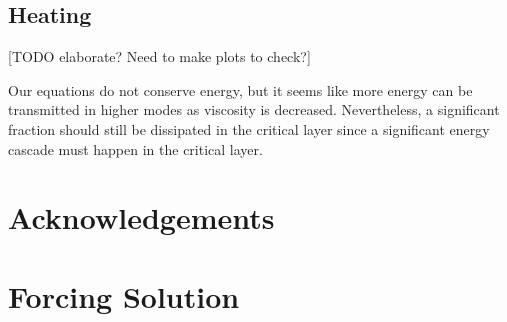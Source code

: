 \documentclass[
        fleqn,
        usenatbib,
    ]{mnras}
\begin{document}
\subsection{Heating}

[TODO elaborate? Need to make plots to check?]

Our equations do not conserve energy, but it seems like more energy can be
transmitted in higher modes as viscosity is decreased. Nevertheless, a
significant fraction should still be dissipated in the critical layer since a
significant energy cascade must happen in the critical layer.

\section{Acknowledgements}\label{s:ack}




\clearpage
\onecolumn
\appendix

\section{Forcing Solution}\label{s:force_solved}
\end{document}
